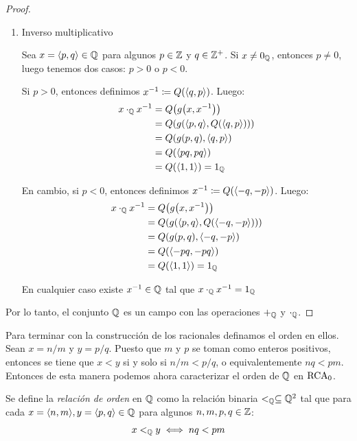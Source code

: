 \begin{proof}
\begin{enumerate}
		\item Inverso multiplicativo

		Sea $x =\inner*{p, q}\in\QQ$ para algunos $p\in\ZZ$ y $q\in\ZZ^{+}$. Si $x\neq 0_{\QQ}$, entonces $p\neq 0$, luego tenemos dos casos: $p > 0$ o $p < 0$.

		Si $p > 0$, entonces definimos $x^{-1}\coloneqq Q\pa*{\inner*{q, p}}$. Luego:
		\begin{align*}
			x\cdot_{\QQ} x^{-1} &= Q\pa*{g\pa*{x, x^{-1}}}\\
			&= Q\pa*{g\pa*{\inner*{p, q}, Q\pa*{\inner*{q, p}}}}\\
			&= Q\pa*{g\pa*{p, q},\inner*{q, p}}\\
			&= Q\pa*{\inner*{pq, pq}}\\
			&= Q\pa*{\inner*{1, 1}} = 1_{\QQ}
		\end{align*}

		En cambio, si $p < 0$, entonces definimos $x^{-1}\coloneqq Q\pa*{\inner*{-q, -p}}$. Luego:
		\begin{align*}
			x\cdot_{\QQ} x^{-1} &= Q\pa*{g\pa*{x, x^{-1}}}\\
			&= Q\pa*{g\pa*{\inner*{p, q}, Q\pa*{\inner*{-q, -p}}}}\\
			&= Q\pa*{g\pa*{p, q},\inner*{-q, -p}}\\
			&= Q\pa*{\inner*{-pq, -pq}}\\
			&= Q\pa*{\inner*{1, 1}} = 1_{\QQ}
		\end{align*}

		En cualquier caso existe $x^{-1}\in\QQ$ tal que $x\cdot_{\QQ}x^{-1} = 1_{\QQ}$
	\end{enumerate}

	Por lo tanto, el conjunto $\QQ$ es un campo con las operaciones $+_{\QQ}$ y $\cdot_{\QQ}$.
\end{proof}

Para terminar con la construcción de los racionales definamos el orden en ellos. Sean $x = n / m$ y $y = p / q$. Puesto que $m$ y $p$ se toman como enteros positivos, entonces se tiene que $x < y$ si y solo si $n / m < p / q$, o equivalentemente $nq < pm$. Entonces de esta manera podemos ahora caracterizar el orden de $\QQ$ en $\RCA$.

\begin{definition}[Orden en $\QQ$]
	Se define la \emph{relación de orden} en $\QQ$ como la relación binaria $<_{\QQ}\subseteq\QQ^{2}$ tal que para cada $x =\inner*{n, m}, y =\inner*{p, q}\in\QQ$ para algunos $n, m, p, q\in\ZZ$:
	\[
		x <_{\QQ} y\iff nq < pm
	\]
\end{definition}

